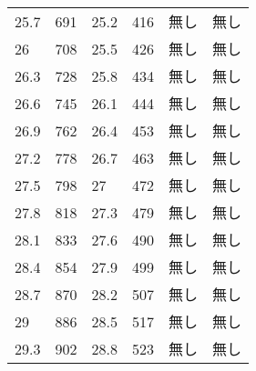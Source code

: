 \documentclass{jsarticle}
\begin{document}
\begin{longtable}[h]
\begin{longtable}{llllll}
25.7                     & 691                     & 25.2                    & 416                     & 無し                      & 無し                      \\
26                       & 708                     & 25.5                    & 426                     & 無し                      & 無し                      \\
26.3                     & 728                     & 25.8                    & 434                     & 無し                      & 無し                      \\
26.6                     & 745                     & 26.1                    & 444                     & 無し                      & 無し                      \\
26.9                     & 762                     & 26.4                    & 453                     & 無し                      & 無し                      \\
27.2                     & 778                     & 26.7                    & 463                     & 無し                      & 無し                      \\
27.5                     & 798                     & 27                      & 472                     & 無し                      & 無し                      \\
27.8                     & 818                     & 27.3                    & 479                     & 無し                      & 無し                      \\
28.1                     & 833                     & 27.6                    & 490                     & 無し                      & 無し                      \\
28.4                     & 854                     & 27.9                    & 499                     & 無し                      & 無し                      \\
28.7                     & 870                     & 28.2                    & 507                     & 無し                      & 無し                      \\
29                       & 886                     & 28.5                    & 517                     & 無し                      & 無し                      \\
29.3                     & 902                     & 28.8                    & 523                     & 無し                      & 無し                      \\

\end{longtable}
\end{longtable}
\end{document}
